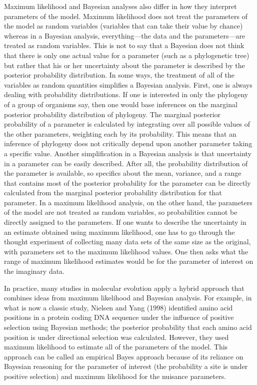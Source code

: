 \documentclass{svmult}
\begin{document}
Maximum likelihood and Bayesian analyses also differ in how they interpret parameters of the model.
Maximum likelihood does not treat the parameters of the model as random variables (variables
that can take their value by chance) whereas in a Bayesian analysis, everything---the data and the
parameters---are treated as random variables. This is not to say that a Bayesian does not think that
there is only one actual value for a parameter (such as a phylogenetic tree) but rather that his or
her uncertainty about the parameter is described by the posterior probability distribution. In some
ways, the treatment of all of the variables as random quantities simplifies a Bayesian analysis.
First, one is always dealing with probability distributions. If one is interested in only the
phylogeny of a group of organisms say, then one would base inferences on the marginal posterior
probability distribution of phylogeny. The marginal posterior probability of a parameter is calculated
by integrating over all possible values of the other parameters, weighting each by its probability.
This means that an inference of phylogeny does not critically depend upon another parameter
taking a specific value. Another simplification in a Bayesian analysis is that uncertainty in a
parameter can be easily described. After all, the probability distribution of the parameter is
available, so specifics about the mean, variance, and a range that contains most of the posterior
probability for the parameter can be directly calculated from the marginal posterior probability
distribution for that parameter. In a maximum likelihood analysis, on the other hand, the parameters of
the model are not treated as random variables, so probabilities cannot be directly assigned to the
parameters. If one wants to describe the uncertainty in an estimate obtained using maximum likelihood,
one has to go through the thought experiment of collecting many data sets of the same size as the
original, with parameters set to the maximum likelihood values. One then asks what the range of maximum
likelihood estimates would be for the parameter of interest on the imaginary data.

In practice, many studies in molecular evolution apply a hybrid approach that combines ideas from
maximum likelihood and Bayesian analysis. For example, in what is now a classic study, Nielsen
and Yang (1998) identified amino acid positions in a protein coding DNA sequence under the
influence of positive selection using Bayesian methods; the posterior probability that each
amino acid position is under directional selection was calculated. However, they used maximum
likelihood to estimate all of the parameters of the model. This approach can be called an
empirical Bayes approach because of its reliance on Bayesian reasoning for the parameter of
interest (the probability a site is under positive selection) and maximum likelihood for the
nuisance parameters.
\end{document}
